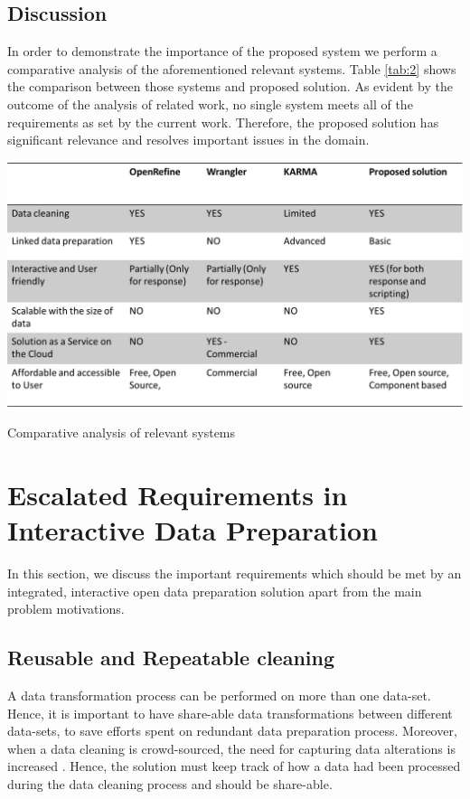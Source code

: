 \subsection{Discussion}
In order to demonstrate the importance of the proposed system we perform a comparative analysis of the aforementioned relevant systems. Table \ref{tab:2} shows the comparison between those systems and proposed solution. As evident by the outcome of the analysis of related work, no single system meets all of the requirements as set by the current work. Therefore, the proposed solution has significant relevance and resolves important issues in the domain. 
\begin{center}
	\includegraphics[width=38em]{./Figures/comparative_analysis}
	\begin{table}[htbp]
    \caption{Comparative analysis of relevant systems}
    \label{tab:2}
	\end{table}
\end{center}
\section{Escalated Requirements in Interactive Data Preparation}
\label{sec:requirements}
In this section, we discuss the important requirements which should be met by an integrated, interactive open data preparation solution apart from the main problem motivations. 
\subsection{Reusable and Repeatable cleaning}
\noindent A data transformation process can be performed on more than one data-set. Hence, it is important to have share-able data transformations between different data-sets, to save efforts spent on redundant data preparation process. Moreover, when a data cleaning is crowd-sourced, the need for capturing data alterations is increased \cite{2011-wrangler}.  Hence, the solution must keep track of how a data had been processed during the data cleaning process and should be share-able. 

